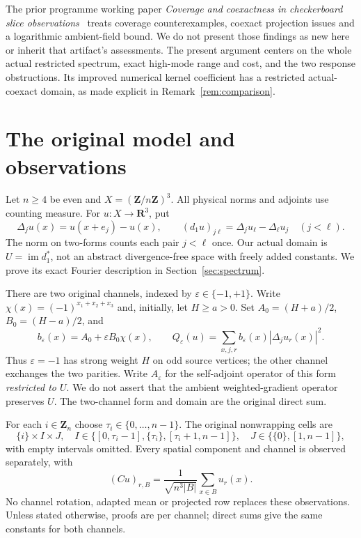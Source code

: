 \documentclass[11pt]{article}
\newcommand{\R}{\mathbf R}
\newcommand{\Z}{\mathbf Z}
\DeclareMathOperator{\im}{im}
\theoremstyle{definition}
\theoremstyle{remark}
\begin{document}
The prior programme working paper \emph{Coverage and coexactness in
checkerboard slice observations}~\cite{Eriksson274} treats coverage
counterexamples, coexact projection issues and a logarithmic ambient-field
bound. We do not present those findings as new here or inherit that
artifact's assessments. The present argument centers on the whole actual
restricted spectrum, exact high-mode range and cost, and the two response
obstructions. Its improved numerical kernel coefficient has a restricted
actual-coexact domain, as made explicit in Remark~\ref{rem:comparison}.

\section{The original model and observations}\label{sec:model}
Let $n\ge4$ be even and $X=(\Z/n\Z)^3$. All physical norms and adjoints use
counting measure. For $u:X\to\R^3$, put
\[
 \Delta_j u(x)=u(x+e_j)-u(x),\qquad
 (d_1u)_{j\ell}=\Delta_j u_\ell-\Delta_\ell u_j\quad(j<\ell).
\]
The norm on two-forms counts each pair $j<\ell$ once. Our actual domain is
$U=\im d_1^*$, not an abstract divergence-free space with freely added
constants. We prove its exact Fourier description in Section~\ref{sec:spectrum}.

There are two original channels, indexed by $\varepsilon\in\{-1,+1\}$.
Write $\chi(x)=(-1)^{x_1+x_2+x_3}$ and, initially, let $H\ge a>0$.
Set $A_0=(H+a)/2$, $B_0=(H-a)/2$, and
\begin{equation}\label{eq:originalQ}
 b_\varepsilon(x)=A_0+\varepsilon B_0\chi(x),\qquad
 Q_\varepsilon(u)=\sum_{x,j,r}b_\varepsilon(x)|\Delta_j u_r(x)|^2.
\end{equation}
Thus $\varepsilon=-1$ has strong weight $H$ on odd source vertices; the
other channel exchanges the two parities. Write $A_\varepsilon$ for the
self-adjoint operator of this form \emph{restricted to $U$}. We do not
assert that the ambient weighted-gradient operator preserves $U$.
The two-channel form and domain are the original direct sum.

For each $i\in\Z_n$ choose $\tau_i\in\{0,\ldots,n-1\}$. The original
nonwrapping cells are
\[
 \{i\}\times I\times J,\quad
 I\in\{[0,\tau_i-1],\{\tau_i\},[\tau_i+1,n-1]\},\quad
 J\in\{\{0\},[1,n-1]\},
\]
with empty intervals omitted. Every spatial component and channel is
observed separately, with
\begin{equation}\label{eq:C}
 (Cu)_{r,B}=\frac{1}{\sqrt{n^3|B|}}\sum_{x\in B}u_r(x).
\end{equation}
No channel rotation, adapted mean or projected row replaces these observations.
Unless stated otherwise, proofs are per channel; direct sums give the same
constants for both channels.
\end{document}
